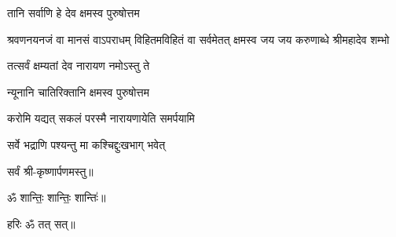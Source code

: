 
{तानि सर्वाणि हे देव क्षमस्व पुरुषोत्तम}

{श्रवणनयनजं वा मानसं वाऽपराधम्}
{विहितमविहितं वा सर्वमेतत् क्षमस्व}
{जय जय करुणाब्धे श्रीमहादेव शम्भो}

{तत्सर्वं क्षम्यतां देव नारायण नमोऽस्तु ते}

{न्यूनानि चातिरिक्तानि क्षमस्व पुरुषोत्तम}

{करोमि यद्यत् सकलं परस्मै नारायणायेति समर्पयामि}

{सर्वे भद्राणि पश्यन्तु मा कश्चिद्दुःखभाग् भवेत्}
\centerline{सर्वं श्री-कृष्णार्पणमस्तु॥}
\centerline{ॐ शान्तिः॒ शान्तिः॒ शान्तिः॑॥}
\centerline{हरिः ॐ तत् सत्॥}

\closesection